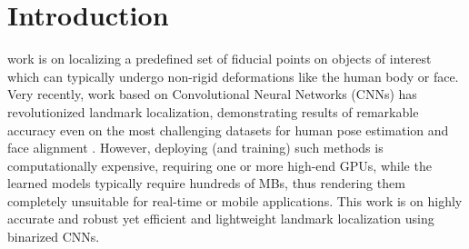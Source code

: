 \documentclass[10pt,journal,compsoc]{IEEEtran}
\begin{document}
\maketitle


\IEEEdisplaynontitleabstractindextext



\IEEEpeerreviewmaketitle


\ifCLASSOPTIONcompsoc
\else
    \section{Introduction}
	\label{sec:introduction}
\fi







 work is on localizing a predefined set of fiducial points on objects of interest which can typically undergo non-rigid deformations like the human body or face. Very recently, work based on Convolutional Neural Networks (CNNs) has revolutionized landmark localization, demonstrating results of remarkable accuracy even on the most challenging datasets for human pose estimation \cite{ bulat2016human,newell2016stacked,wei2016convolutional} and face alignment \cite{bulat2016two}. However, deploying (and training) such methods is computationally expensive, requiring one or more high-end GPUs, while the learned models typically require hundreds of MBs, thus rendering them completely unsuitable for real-time or mobile applications. This work is on highly accurate and robust yet efficient and lightweight landmark localization using binarized CNNs.
\end{document}
